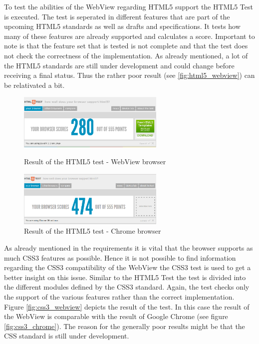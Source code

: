 
To test the abilities of the WebView regarding HTML5 support the HTML5 Test \autocite{tech-ana:html5-test} is executed.
The test is seperated in different features that are part of the upcoming HTML5 standards as well as drafts and specifications.
It tests how many of these features are already supported and calculates a score.
Important to note is that the feature set that is tested is not complete and that the test does not check the correctness of the implementation.
As already mentioned, a lot of the HTML5 standards are still under development and could change before receiving a final status.
Thus the rather poor result (see \ref{fig:html5_webview}) can be relativated a bit.

\begin{figure}
\begin{minipage}[t]{7cm}
	\centering
	\includegraphics[width=7cm]{./img/tech-ana/html5_result_webview.png}
	\caption{Result of the HTML5 test - WebView browser}
	\label{fig:html5_webview}
\end{minipage}
\hfill
\begin{minipage}[t]{7cm}
	\centering
	\includegraphics[width=7cm]{./img/tech-ana/html5_result_chrome.png}
	\caption{Result of the HTML5 test - Chrome browser}
	\label{fig:html5_chrome}
\end{minipage}
\end{figure}


As already mentioned in the requirements it is vital that the browser supports as much CSS3 features as possible.
Hence it is not possible to find information regarding the CSS3 compatibility of the WebView the CSS3 test  \autocite{tech-ana:css3-test} is used to get a better insight on this issue.
Similar to the HTML5 Test the test is divided into the different modules defined by the CSS3 standard.
Again, the test checks only the support of the various features rather than the correct implementation.
Figure \ref{fig:css3_webview} depicts the result of the test.
In this case the result of the WebView is comparable with the result of Google Chrome (see figure \ref{fig:css3_chrome}).
The reason for the generally poor results might be that the CSS standard is still under development.

